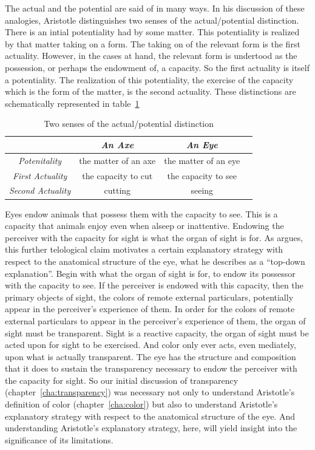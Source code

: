 The actual and the potential are said of in many ways. In his discussion of these analogies, Aristotle distinguishes two senses of the actual/potential distinction. There is an intial potentiality had by some matter. This potentiality is realized by that matter taking on a form. The taking on of the relevant form is the first actuality. However, in the cases at hand, the relevant form is undertood as the possession, or perhaps the endowment of, a capacity. So the first actuality is itself a potentiality. The realization of this potentiality, the exercise of the capacity which is the form of the matter, is the second actuality. These distinctions are schematically represented in table~\ref{tab:potential}

\begin{table}[htbp]
	\centering
		\begin{tabular}{cccc}
			& \emph{An Axe} & \emph{An Eye}\\
			\hline
			\emph{Potenitality} & the matter of an axe & the matter of an eye\\
			\hline
			\emph{First Actuality} & the capacity to cut & the capacity to see\\
			\hline
			\emph{Second Actuality} & cutting & seeing\\
			\hline
		\end{tabular}
	\caption{Two senses of the actual/potential distinction}
	\label{tab:potential}
\end{table}

Eyes endow animals that possess them with the capacity to see. This is a capacity that animals enjoy even when alseep or inattentive. Endowing the perceiver with the capacity for sight is what the organ of sight is for. As \citet{Johansen:1997zr} argues, this further telological claim motivates a certain explanatory strategy with respect to the anatomical structure of the eye, what he describes as a ``top-down explanation''. Begin with what the organ of sight is for, to endow its possessor with the capacity to see. If the perceiver is endowed with this capacity, then the primary objects of sight, the colors of remote external particulars, potentially appear in the perceiver's experience of them. In order for the colors of remote external particulars to appear in the perceiver's experience of them, the organ of sight must be transparent. Sight is a reactive capacity, the organ of sight must be acted upon for sight to be exercised. And color only ever acts, even mediately, upon what is actually transparent. The eye has the structure and composition that it does to sustain the transparency necessary to endow the perceiver with the capacity for sight. So our initial discussion of transparency (chapter~\ref{cha:transparency}) was necessary not only to understand Aristotle's definition of color (chapter~\ref{cha:color}) but also to understand Aristotle's explanatory strategy with respect to the anatomical structure of the eye. And understanding Aristotle's explanatory strategy, here, will yield insight into the significance of its limitations.



